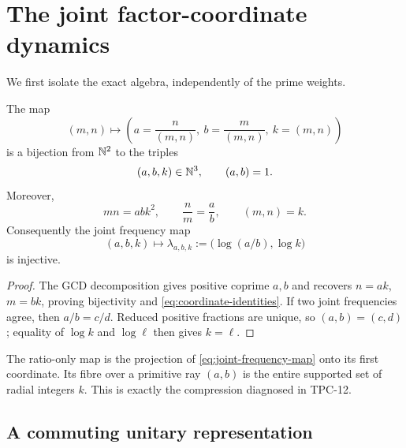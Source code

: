 \section{The joint factor-coordinate dynamics}
\label{sec:joint-dynamics}

We first isolate the exact algebra, independently of the prime weights.

\begin{proposition}
\label{prop:coordinate-bijection}
The map
\begin{equation}
 (m,n)\longmapsto
 \left(a=\frac{n}{(m,n)},\ b=\frac{m}{(m,n)},\ k=(m,n)\right)
 \label{eq:coordinate-map}
\end{equation}
is a bijection from $\mathbb N^2$ to the triples
\[
 (a,b,k)\in\mathbb N^3,\qquad (a,b)=1.
\]
Moreover,
\begin{equation}
 mn=abk^2,
 \qquad \frac nm=\frac ab,
 \qquad (m,n)=k.
 \label{eq:coordinate-identities}
\end{equation}
Consequently the joint frequency map
\begin{equation}
 (a,b,k)\longmapsto
 \lambda_{a,b,k}:=\bigl(\log(a/b),\log k\bigr)
 \label{eq:joint-frequency-map}
\end{equation}
is injective.
\end{proposition}

\begin{proof}
The GCD decomposition gives positive coprime $a,b$ and recovers
$n=ak$, $m=bk$, proving bijectivity and
\eqref{eq:coordinate-identities}.  If two joint frequencies agree, then
$a/b=c/d$.  Reduced positive fractions are unique, so $(a,b)=(c,d)$;
equality of $\log k$ and $\log\ell$ then gives $k=\ell$.
\end{proof}

The ratio-only map is the projection of \eqref{eq:joint-frequency-map}
onto its first coordinate.  Its fibre over a primitive ray $(a,b)$ is
the entire supported set of radial integers $k$.  This is exactly the
compression diagnosed in TPC-12.

\subsection{A commuting unitary representation}

